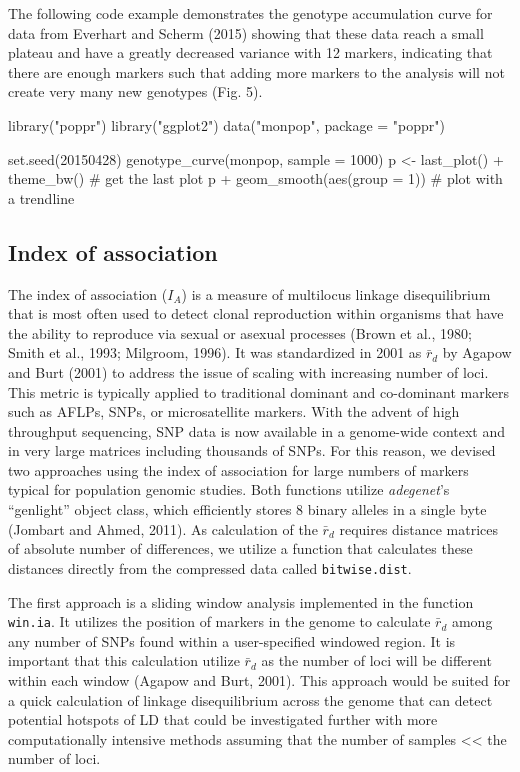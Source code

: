 \documentclass{frontiersSCNS} %
\newenvironment{CodeChunk}{}{}
\begin{document}
The following code example demonstrates the genotype accumulation curve
for data from Everhart and Scherm (2015) showing that these data reach a
small plateau and have a greatly decreased variance with 12 markers,
indicating that there are enough markers such that adding more markers
to the analysis will not create very many new genotypes (Fig. 5).

\begin{CodeChunk}
\begin{CodeInput}
library("poppr")
library("ggplot2")
data("monpop", package = "poppr")

set.seed(20150428)
genotype_curve(monpop, sample = 1000)
p <- last_plot() + theme_bw()   # get the last plot
p + geom_smooth(aes(group = 1)) # plot with a trendline
\end{CodeInput}
\end{CodeChunk}

\subsection*{Index of association}\label{index-of-association}

The index of association (\(I_A\)) is a measure of multilocus linkage
disequilibrium that is most often used to detect clonal reproduction
within organisms that have the ability to reproduce via sexual or
asexual processes (Brown et al., 1980; Smith et al., 1993; Milgroom,
1996). It was standardized in 2001 as \(\bar{r}_d\) by Agapow and Burt
(2001) to address the issue of scaling with increasing number of loci.
This metric is typically applied to traditional dominant and co-dominant
markers such as AFLPs, SNPs, or microsatellite markers. With the advent
of high throughput sequencing, SNP data is now available in a
genome-wide context and in very large matrices including thousands of
SNPs. For this reason, we devised two approaches using the index of
association for large numbers of markers typical for population genomic
studies. Both functions utilize \emph{adegenet}'s ``genlight'' object
class, which efficiently stores 8 binary alleles in a single byte
(Jombart and Ahmed, 2011). As calculation of the \(\bar{r}_d\) requires
distance matrices of absolute number of differences, we utilize a
function that calculates these distances directly from the compressed
data called \texttt{bitwise.dist}.

The first approach is a sliding window analysis implemented in the
function \texttt{win.ia}. It utilizes the position of markers in the
genome to calculate \(\bar{r}_d\) among any number of SNPs found within
a user-specified windowed region. It is important that this calculation
utilize \(\bar{r}_d\) as the number of loci will be different within
each window (Agapow and Burt, 2001). This approach would be suited for a
quick calculation of linkage disequilibrium across the genome that can
detect potential hotspots of LD that could be investigated further with
more computationally intensive methods assuming that the number of
samples \textless{}\textless{} the number of loci.
\end{document}
